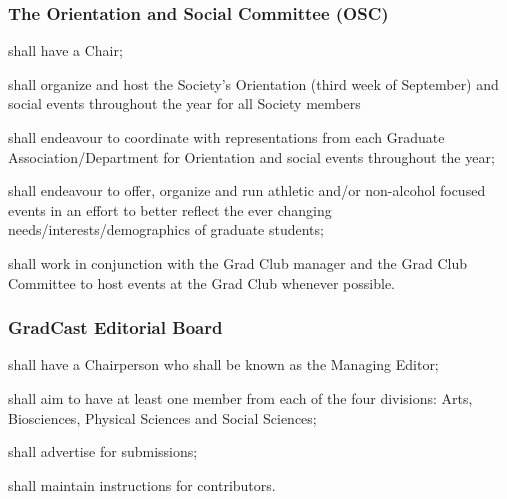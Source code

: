 \subsubsection{The Orientation and Social Committee (OSC)}
\begin{longenum}[ label*=\thesubsubsection.\arabic*., align=left]
	\item shall have a Chair;
    \item  shall organize and host the Society's Orientation (third week of September) and social events throughout the year for all Society members
    \item  shall endeavour to coordinate with representations from each Graduate 
    Association/Department for Orientation and social events throughout the year;
    \item  shall endeavour to offer, organize and run athletic and/or non-alcohol focused events in an effort to better reflect the ever changing needs/interests/demographics of graduate students; 
    \item shall work in conjunction with the Grad Club manager and the Grad Club Committee to host events at the Grad Club whenever possible.

\end{longenum}
 
\subsubsection{GradCast  Editorial Board}
\begin{longenum}[ label*=\thesubsubsection.\arabic*., align=left]
	\item  shall have a Chairperson who shall be known as the Managing Editor;
    \item shall aim to have at least one member from each of the four divisions: Arts, Biosciences, Physical Sciences and Social Sciences;
    \item shall advertise for submissions;
    \item shall maintain instructions for contributors.
\end{longenum}
 
